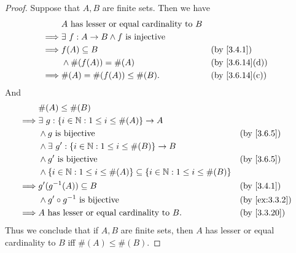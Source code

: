 \begin{proof}
  Suppose that \(A, B\) are finite sets.
  Then we have
  \begin{align*}
             & A \text{ has lesser or equal cardinality to } B                                     \\
    \implies & \exists\ f : A \to B \land f \text{ is injective}                                   \\
    \implies & f(A) \subseteq B                                  &  & \by{3.4.1}                   \\
             & \land \#(f(A)) = \#(A)                            &  & \text{(by \cref{3.6.14}(d))} \\
    \implies & \#(A) = \#(f(A)) \leq \#(B).                      &  & \text{(by \cref{3.6.14}(c))}
  \end{align*}
  And
  \begin{align*}
             & \#(A) \leq \#(B)                                                                                                       \\
    \implies & \exists\ g : \{i \in \N : 1 \leq i \leq \#(A)\} \to A                                                                  \\
             & \land g \text{ is bijective}                                                          &  & \by{3.6.5}                  \\
             & \land \exists\ g' : \{i \in \N : 1 \leq i \leq \#(B)\} \to B                                                           \\
             & \land g' \text{ is bijective}                                                         &  & \by{3.6.5}                  \\
             & \land \{i \in \N : 1 \leq i \leq \#(A)\} \subseteq \{i \in \N : 1 \leq i \leq \#(B)\}                                  \\
    \implies & g'(g^{-1}(A)) \subseteq B                                                             &  & \by{3.4.1}                  \\
             & \land g' \circ g^{-1} \text{ is bijective}                                            &  & \text{(by \cref{ex:3.3.2})} \\
    \implies & A \text{ has lesser or equal cardinality to } B.                                      &  & \text{(by \cref{3.3.20})}
  \end{align*}
  Thus we conclude that if \(A, B\) are finite sets, then \(A\) has lesser or equal cardinality to \(B\) iff \(\#(A) \leq \#(B)\).
\end{proof}

